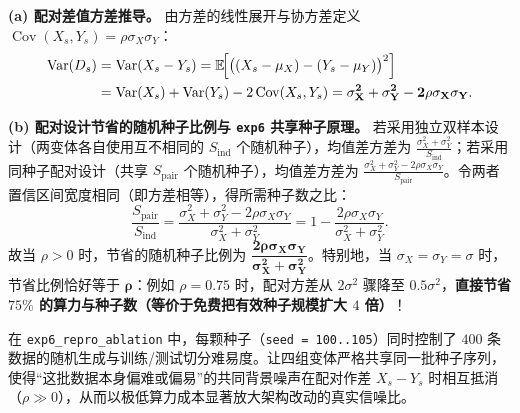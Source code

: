 
\textbf{(a) 配对差值方差推导。}
由方差的线性展开与协方差定义 $\operatorname{Cov}(X_s, Y_s) = \rho\sigma_X\sigma_Y$：
\begin{align*}
  \operatorname{Var}(D_s) &= \operatorname{Var}(X_s - Y_s)
             = \mathbb{E}\!\Big[\big((X_s - \mu_X) - (Y_s - \mu_Y)\big)^2\Big] \\
            &= \operatorname{Var}(X_s) + \operatorname{Var}(Y_s) - 2\operatorname{Cov}(X_s, Y_s)
             = \mathbf{\sigma_X^2 + \sigma_Y^2 - 2\rho\sigma_X\sigma_Y}.
\end{align*}

\textbf{(b) 配对设计节省的随机种子比例与 \texttt{exp6} 共享种子原理。}
若采用独立双样本设计（两变体各自使用互不相同的 $S_{\text{ind}}$ 个随机种子），均值差方差为 $\frac{\sigma_X^2 + \sigma_Y^2}{S_{\text{ind}}}$；若采用同种子配对设计（共享 $S_{\text{pair}}$ 个随机种子），均值差方差为 $\frac{\sigma_X^2 + \sigma_Y^2 - 2\rho\sigma_X\sigma_Y}{S_{\text{pair}}}$。令两者置信区间宽度相同（即方差相等），得所需种子数之比：
\[
  \frac{S_{\text{pair}}}{S_{\text{ind}}}
  = \frac{\sigma_X^2 + \sigma_Y^2 - 2\rho\sigma_X\sigma_Y}{\sigma_X^2 + \sigma_Y^2}
  = 1 - \frac{2\rho\sigma_X\sigma_Y}{\sigma_X^2 + \sigma_Y^2}.
\]
故当 $\rho > 0$ 时，节省的随机种子比例为 $\mathbf{\dfrac{2\rho\sigma_X\sigma_Y}{\sigma_X^2 + \sigma_Y^2}}$。特别地，当 $\sigma_X = \sigma_Y = \sigma$ 时，节省比例恰好等于 $\mathbf{\rho}$：例如 $\rho = 0.75$ 时，配对方差从 $2\sigma^2$ 骤降至 $0.5\sigma^2$，\textbf{直接节省 $75\%$ 的算力与种子数（等价于免费把有效种子规模扩大 $4$ 倍）}！

在 \texttt{exp6\_repro\_ablation} 中，每颗种子（\texttt{seed = 100..105}）同时控制了 $400$ 条数据的随机生成与训练/测试切分难易度。让四组变体严格共享同一批种子序列，使得“这批数据本身偏难或偏易”的共同背景噪声在配对作差 $X_s - Y_s$ 时相互抵消（$\rho \gg 0$），从而以极低算力成本显著放大架构改动的真实信噪比。


